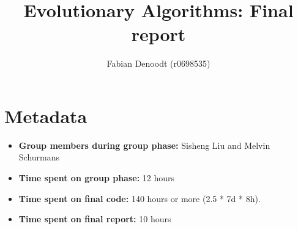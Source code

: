 \documentclass[a4paper,10pt]{article}
\title{Evolutionary Algorithms: Final report}
\author{Fabian Denoodt (r0698535)}
\def\retake{0}
\newcommand{\switch}[2]{\ifnum\retake=0{#1}\else{#2}\fi}
\newcommand{\thisyear}{\the\year}
\newcommand{\deadlineCode}{\switch{December 31, \thisyear{} at 18:00 CET}{August 14, \thisyear{} at 18:00 CET}}
\newcommand{\deadlineReport}{\deadlineCode}
\newcommand{\ReplaceMe}[1]{{\color{blue}#1}}
\newcommand{\RemoveMe}[1]{{\color{purple}#1}}
\begin{document}
\selectfont{}

\maketitle

%
%
%
%
%
%

\section{Metadata}

\begin{itemize}
 \item \textbf{Group members during group phase:} Sisheng Liu and Melvin Schurmans
 \item \textbf{Time spent on group phase:} 12 hours
 \item \textbf{Time spent on final code:} 140 hours or more (2.5 * 7d * 8h).
 \item \textbf{Time spent on final report:} \ReplaceMe{10 hours}
\end{itemize}
\end{document}
